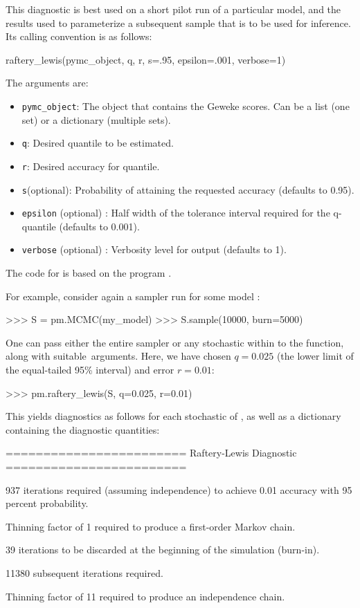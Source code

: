 \documentclass[]{jss}
\begin{document}
This diagnostic is best used on a short pilot run of a particular model, and the results used to parameterize a subsequent sample that is to be used for inference. Its calling convention is as follows:
\begin{CodeInput}
raftery_lewis(pymc_object, q, r, s=.95, epsilon=.001, verbose=1)
\end{CodeInput}
The arguments are:
\begin{itemize}

  \item \verb=pymc_object=: The object that contains the Geweke scores. Can be a list (one set) or a dictionary (multiple sets).

    \item \verb=q=: Desired quantile to be estimated.

    \item \verb=r=: Desired accuracy for quantile.

    \item \verb=s=(optional): Probability of attaining the requested accuracy (defaults to 0.95).

    \item \verb=epsilon= (optional) : Half width of the tolerance interval required for the q-quantile (defaults to 0.001).

    \item \verb=verbose= (optional) : Verbosity level for output (defaults to 1).
\end{itemize}

The code for  is based on the   program  \citep{gibbsit}.

For example, consider again a sampler  run for some model :
\begin{CodeInput}
>>> S = pm.MCMC(my_model)
>>> S.sample(10000, burn=5000)
\end{CodeInput}
One can pass either the entire sampler  or any stochastic within  to the  function, along with suitable~arguments. Here, we have chosen $q=0.025$ (the lower limit of the equal-tailed 95\% interval) and error $r=0.01$:
\begin{CodeInput}
>>> pm.raftery_lewis(S, q=0.025, r=0.01)
\end{CodeInput}
This yields diagnostics as follows for each stochastic of , as well as a dictionary containing the diagnostic quantities:

\begin{CodeInput}
========================
Raftery-Lewis Diagnostic
========================

937 iterations required (assuming independence) to achieve 0.01 accuracy
with 95 percent probability.

Thinning factor of 1 required to produce a first-order Markov chain.

39 iterations to be discarded at the beginning of the simulation (burn-in).

11380 subsequent iterations required.

Thinning factor of 11 required to produce an independence chain.
\end{CodeInput}
\end{document}
